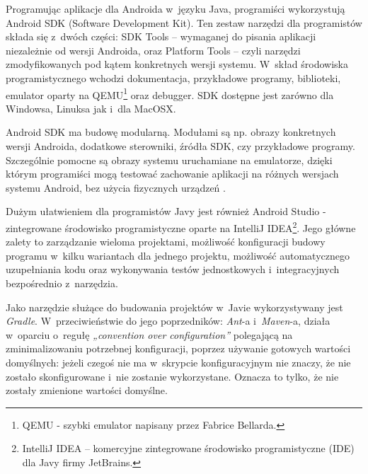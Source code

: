 Programując aplikacje dla Androida w~języku Java, programiści wykorzystują Android SDK (Software Development Kit). Ten zestaw narzędzi dla programistów składa się z~dwóch części: SDK Tools – wymaganej do pisania aplikacji niezależnie od wersji Androida, oraz Platform Tools – czyli narzędzi zmodyfikowanych pod kątem konkretnych wersji systemu. W~skład środowiska programistycznego wchodzi dokumentacja, przykładowe programy, biblioteki, emulator oparty na QEMU\footnote{QEMU - szybki emulator napisany przez Fabrice Bellarda.} oraz debugger. SDK dostępne jest zarówno dla Windowsa, Linuksa jak i~dla MacOSX.

Android SDK ma budowę modularną. Modułami są np. obrazy konkretnych wersji Androida, dodatkowe sterowniki, źródła SDK, czy przykładowe programy. Szczególnie pomocne są obrazy systemu uruchamiane na emulatorze, dzięki którym programiści mogą  testować zachowanie aplikacji na różnych wersjach systemu Android, bez użycia fizycznych urządzeń \cite{website:wikipedia}.

Dużym ułatwieniem dla programistów Javy jest również Android Studio - zintegrowane środowisko programistyczne oparte na IntelliJ IDEA\footnote{IntelliJ IDEA – komercyjne zintegrowane środowisko programistyczne (IDE) dla Javy firmy JetBrains.}. Jego główne zalety to zarządzanie wieloma projektami, możliwość konfiguracji budowy programu w~kilku wariantach dla jednego projektu, możliwość automatycznego uzupełniania kodu oraz wykonywania testów jednostkowych i~integracyjnych bezpośrednio z~narzędzia.

Jako narzędzie służące do budowania projektów w~Javie wykorzystywany jest \textit{Gradle}. W~przeciwieństwie do jego poprzedników: \textit{Ant}-a i~\textit{Maven}-a, działa w~oparciu o~regułę \textit{„convention over configuration”} polegającą na zminimalizowaniu potrzebnej konfiguracji, poprzez używanie gotowych wartości domyślnych: jeżeli czegoś nie ma w~skrypcie konfiguracyjnym nie znaczy, że nie zostało skonfigurowane i~nie zostanie wykorzystane. Oznacza to tylko, że nie zostały zmienione wartości domyślne.

